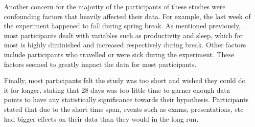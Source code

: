 Another concern for the majority of the participants of these studies were confounding factors that heavily affected their data. For example, the last week of the experiment happened to fall during spring break. As mentioned previously, most participants dealt with variables such as productivity and sleep, which for most is highly diminished and increased respectively during break. Other factors include participants who travelled or were sick during the experiment. These factors seemed to greatly impact the data for most participants.

Finally, most participants felt the study was too short and wished they could do it for longer, stating that 28 days was too little time to garner enough data points to have any statistically significance towards their hypothesis. Participants stated that due to the short time span, events such as exams, presentations, etc had bigger effects on their data than they would in the long run. 

